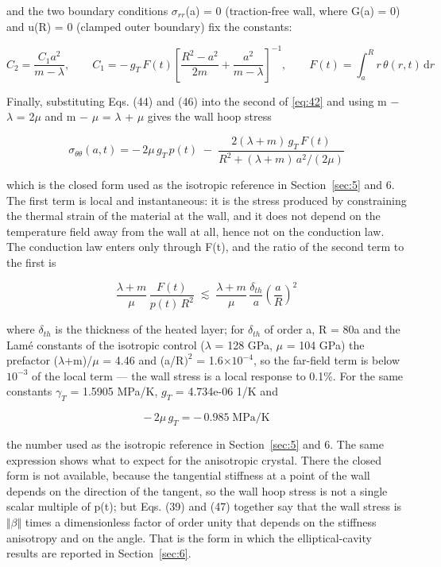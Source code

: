 \documentclass[preprint,12pt]{elsarticle}
\begin{document}
and the two boundary conditions $\sigma_{rr}$(a) = 0 (traction-free wall, where G(a) = 0) and u(R) = 0 (clamped outer boundary) fix the constants:

\begin{equation}
C_2=\frac{C_1a^2}{m-\lambda},\qquad C_1=-\,g_T\,F(t)\left[\frac{R^2-a^2}{2m}+\frac{a^2}{m-\lambda}\right]^{-1},\qquad F(t)=\int_a^R r\,\theta(r,t)\,\mathrm{d}r 
\label{eq:46}
\end{equation}

Finally, substituting Eqs. (44) and (46) into the second of \eqref{eq:42} and using m $-$ $\lambda$ = 2$\mu$ and m $-$ $\mu$ = $\lambda$ + $\mu$ gives the wall hoop stress

\begin{equation}
\sigma_{\theta\theta}(a,t)=-\,2\mu\,g_T\,p(t)\;-\;\frac{2(\lambda+m)\,g_T\,F(t)}{R^{2}+(\lambda+m)\,a^{2}/(2\mu)} 
\label{eq:47}
\end{equation}

which is the closed form used as the isotropic reference in Section~\ref{sec:5} and 6. The first term is local and instantaneous: it is the stress produced by constraining the thermal strain of the material at the wall, and it does not depend on the temperature field away from the wall at all, hence not on the conduction law. The conduction law enters only through F(t), and the ratio of the second term to the first is

\begin{equation}
\frac{\lambda+m}{\mu}\,\frac{F(t)}{p(t)\,R^{2}}\;\lesssim\;\frac{\lambda+m}{\mu}\,\frac{\delta_{th}}{a}\left(\frac{a}{R}\right)^{2} 
\label{eq:48}
\end{equation}

where $\delta_{th}$ is the thickness of the heated layer; for $\delta_{th}$ of order a, R = 80a and the Lam\'e constants of the isotropic control ($\lambda$ = 128 GPa, $\mu$ = 104 GPa) the prefactor ($\lambda$+m)/$\mu$ = 4.46 and (a/R$)^{2}$ = 1.6$\times 10^{-4}$, so the far-field term is below $10^{-3}$ of the local term --- the wall stress is a local response to 0.1\%. For the same constants $\gamma_{T}$ = 1.5905 MPa/K, $g_{T}$ = 4.734e-06 1/K and

\begin{equation}
-\,2\mu\,g_T=-\,0.985\;\mathrm{MPa/K} 
\label{eq:49}
\end{equation}

the number used as the isotropic reference in Section~\ref{sec:5} and 6. The same expression shows what to expect for the anisotropic crystal. There the closed form is not available, because the tangential stiffness at a point of the wall depends on the direction of the tangent, so the wall hoop stress is not a single scalar multiple of p(t); but Eqs. (39) and (47) together say that the wall stress is $\Vert \beta \Vert$ times a dimensionless factor of order unity that depends on the stiffness anisotropy and on the angle. That is the form in which the elliptical-cavity results are reported in Section~\ref{sec:6}.
\end{document}
